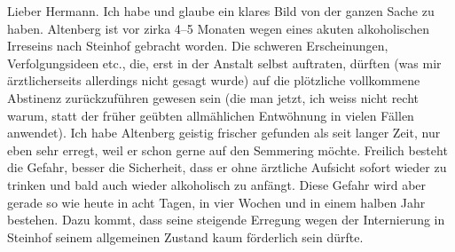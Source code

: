 \pstart{}Lieber Hermann.\pend\vspace{0.5em}
\pstart
           Ich habe \label{K_L02129-1v}\label{K_L02129-1} und glaube ein klares Bild von der ganzen Sache zu haben. Altenberg ist vor zirka 4–5 Monaten wegen eines akuten
               alkoholischen Irreseins nach Steinhof gebracht
               worden. Die schweren Erscheinungen, Verfolgungsideen etc., die, erst in der Anstalt
               selbst auftraten, dürften (was mir ärztlicherseits allerdings nicht gesagt wurde) auf
               die plötzliche vollkommene Abstinenz zurückzuführen gewesen sein (die man jetzt, ich
               weiss nicht recht warum, statt der früher geübten allmählichen Entwöhnung in vielen
               Fällen anwendet). Ich habe Altenberg geistig
               frischer gefunden als seit langer Zeit, nur eben sehr erregt, weil er schon gerne auf
               den Semmering möchte. Freilich besteht die
               Gefahr, besser die Sicherheit, dass er ohne ärztliche Aufsicht sofort wieder zu
               trinken und bald auch wieder alkoholisch {\pb}zu \label{K_L02129-2v}\label{K_L02129-2} anfängt. Diese Gefahr wird aber gerade so wie
               heute in acht Tagen, in vier Wochen und in einem halben Jahr bestehen. Dazu kommt,
               dass seine steigende Erregung wegen der Internierung in Steinhof seinem allgemeinen Zustand kaum förderlich sein dürfte.
